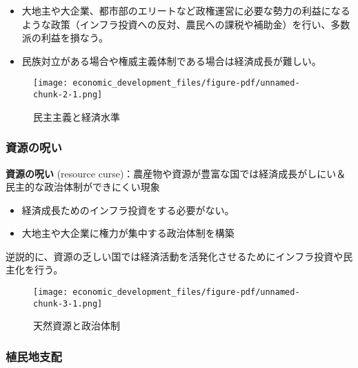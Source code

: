 \documentclass[
  xelatex,
  ja=standard]{bxjsarticle}
\providecommand{\tightlist}{%
  \setlength{\itemsep}{0pt}\setlength{\parskip}{0pt}}\usepackage{longtable,booktabs,array}
\begin{document}
\begin{itemize}
\tightlist
\item
  大地主や大企業、都市部のエリートなど政権運営に必要な勢力の利益になるような政策（インフラ投資への反対、農民への課税や補助金）を行い、多数派の利益を損なう。
\item
  民族対立がある場合\citep{alesina2005}や権威主義体制である場合\citep{baum2003, stasavage2005, brown2009}は経済成長が難しい。
\end{itemize}

\begin{figure}[htpb]

{\centering \texttt{[image: economic\_development\_files/figure-pdf/unnamed-chunk-2-1.png]}

}

\caption{民主主義と経済水準}

\end{figure}

\hypertarget{ux8cc7ux6e90ux306eux546aux3044}{%
\subsubsection{資源の呪い}\label{ux8cc7ux6e90ux306eux546aux3044}}

\textbf{資源の呪い} (resource
curse)：農産物や資源が豊富な国では経済成長がしにい＆民主的な政治体制ができにくい現象\citep{ross1999, mehlum2006, ross2015}

\begin{itemize}
\tightlist
\item
  経済成長ためのインフラ投資をする必要がない。
\item
  大地主や大企業に権力が集中する政治体制を構築
\end{itemize}

逆説的に、資源の乏しい国では経済活動を活発化させるためにインフラ投資や民主化を行う。

\begin{figure}[htpb]

{\centering \texttt{[image: economic\_development\_files/figure-pdf/unnamed-chunk-3-1.png]}

}

\caption{天然資源と政治体制}

\end{figure}

\hypertarget{ux690dux6c11ux5730ux652fux914d}{%
\subsubsection{植民地支配}\label{ux690dux6c11ux5730ux652fux914d}}
\end{document}
